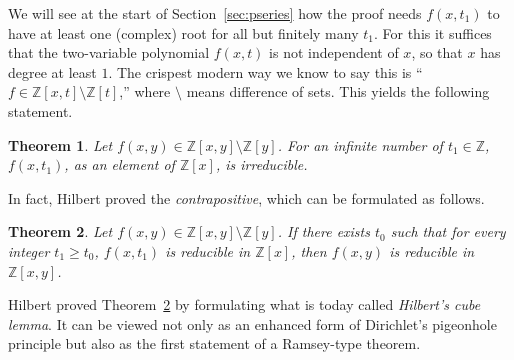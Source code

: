 \documentclass{article}
\theoremstyle{plain}
\newtheorem{thm}{Theorem}
\theoremstyle{definition}
\newcommand{\Zed}{\mathbb{Z}}   %
\begin{document}
We will see at the start of Section~\ref{sec:pseries} how the proof needs $f(x,t_1)$ to have at least one (complex) root for all but finitely many $t_1$.  For this it suffices
that the two-variable polynomial $f(x,t)$ is not independent of $x$, so that $x$ has degree at least $1$.  The crispest modern way we know to say this is ``$f \in \Zed[x,t] \setminus \Zed[t]$,'' where $\setminus$ means difference of sets.  This yields the following statement.



 
\begin{thm} %
\label{irreducibility-2}
Let $f(x,y) \in \Zed[x,y] \setminus \Zed[y]$. For an infinite number of $t_1 \in \Zed$, $f(x,t_1)$, as an element of $\Zed[x]$, is irreducible.
\end{thm}


\noindent 
In fact, Hilbert proved the \emph{contrapositive}, which can be
formulated as follows.

 
\begin{thm} %
\label{irreducibility-contra}
Let $f(x,y)\in \Zed[x,y] \setminus \Zed[y]$. If there exists $t_0$ such that for every
integer 
$t_1 \ge t_0$, $f(x,t_1)$ is reducible in $\Zed[x]$, then $f(x,y)$ is reducible in $\Zed[x,y]$.
\end{thm}




Hilbert proved Theorem~\ref{irreducibility-contra} by formulating what is today called
\emph{Hilbert's cube lemma}. It can be viewed not only as an enhanced
form of Dirichlet's pigeonhole principle but also as the first
statement of a Ramsey-type theorem. 
\end{document}
